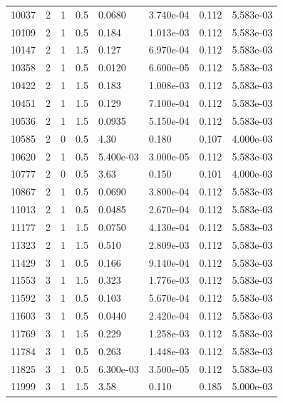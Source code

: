 \documentclass[preview]{standalone}
\begin{document}
{{{{\begin{tabular}{L{1.2cm}C{1.2cm} C{0.3cm}C{0.5cm} C{1.4cm}C{1.4cm} C{1.4cm}C{1.4cm}}
  10037  &     2  & 1     & 0.5 &  0.0680  & 3.740e-04  & 0.112 &  5.583e-03   \\ 
  10109  &     2  & 1     & 0.5 &  0.184  & 1.013e-03  & 0.112 &  5.583e-03   \\ 
  10147  &     2  & 1     & 1.5 &  0.127  & 6.970e-04  & 0.112 &  5.583e-03   \\ 
  10358  &     2  & 1     & 0.5 &  0.0120  & 6.600e-05  & 0.112 &  5.583e-03   \\ 
  10422  &     2  & 1     & 1.5 &  0.183  & 1.008e-03  & 0.112 &  5.583e-03   \\ 
  10451  &     2  & 1     & 1.5 &  0.129  & 7.100e-04  & 0.112 &  5.583e-03   \\ 
  10536  &     2  & 1     & 1.5 &  0.0935  & 5.150e-04  & 0.112 &  5.583e-03   \\ 
  10585  &     2  & 0     & 0.5 &  4.30  & 0.180  & 0.107 &  4.000e-03   \\ 
  10620  &     2  & 1     & 0.5 &  5.400e-03  & 3.000e-05  & 0.112 &  5.583e-03   \\ 
  10777  &     2  & 0     & 0.5 &  3.63  & 0.150  & 0.101 &  4.000e-03   \\ 
  10867  &     2  & 1     & 0.5 &  0.0690  & 3.800e-04  & 0.112 &  5.583e-03   \\ 
  11013  &     2  & 1     & 0.5 &  0.0485  & 2.670e-04  & 0.112 &  5.583e-03   \\ 
  11177  &     2  & 1     & 1.5 &  0.0750  & 4.130e-04  & 0.112 &  5.583e-03   \\ 
  11323  &     2  & 1     & 1.5 &  0.510  & 2.809e-03  & 0.112 &  5.583e-03   \\ 
  11429  &     3  & 1     & 0.5 &  0.166  & 9.140e-04  & 0.112 &  5.583e-03   \\ 
  11553  &     3  & 1     & 1.5 &  0.323  & 1.776e-03  & 0.112 &  5.583e-03   \\ 
  11592  &     3  & 1     & 0.5 &  0.103  & 5.670e-04  & 0.112 &  5.583e-03   \\ 
  11603  &     3  & 1     & 0.5 &  0.0440  & 2.420e-04  & 0.112 &  5.583e-03   \\ 
  11769  &     3  & 1     & 1.5 &  0.229  & 1.258e-03  & 0.112 &  5.583e-03   \\ 
  11784  &     3  & 1     & 0.5 &  0.263  & 1.448e-03  & 0.112 &  5.583e-03   \\ 
  11825  &     3  & 1     & 0.5 &  6.300e-03  & 3.500e-05  & 0.112 &  5.583e-03   \\ 
  11999  &     3  & 1     & 1.5 &  3.58  & 0.110  & 0.185 &  5.000e-03   \\ 

\end{tabular}}}}}
\end{document}
